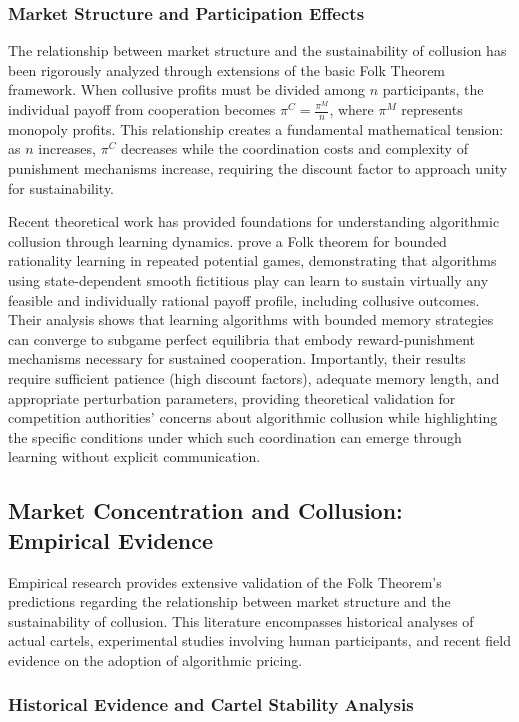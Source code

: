 \subsubsection*{Market Structure and Participation Effects}

The relationship between market structure and the sustainability of collusion has been rigorously analyzed through extensions of the basic Folk Theorem framework. When collusive profits must be divided among $n$ participants, the individual payoff from cooperation becomes $\pi^C = \frac{\pi^M}{n}$, where $\pi^M$ represents monopoly profits. This relationship creates a fundamental mathematical tension: as $n$ increases, $\pi^C$ decreases while the coordination costs and complexity of punishment mechanisms increase, requiring the discount factor to approach unity for sustainability.

Recent theoretical work has provided foundations for understanding algorithmic collusion through learning dynamics. \textcite{cartea_algorithmic_2022} prove a Folk theorem for bounded rationality learning in repeated potential games, demonstrating that algorithms using state-dependent smooth fictitious play can learn to sustain virtually any feasible and individually rational payoff profile, including collusive outcomes. Their analysis shows that learning algorithms with bounded memory strategies can converge to subgame perfect equilibria that embody reward-punishment mechanisms necessary for sustained cooperation. Importantly, their results require sufficient patience (high discount factors), adequate memory length, and appropriate perturbation parameters, providing theoretical validation for competition authorities' concerns about algorithmic collusion while highlighting the specific conditions under which such coordination can emerge through learning without explicit communication.

\subsection{Market Concentration and Collusion: Empirical Evidence}

Empirical research provides extensive validation of the Folk Theorem's predictions regarding the relationship between market structure and the sustainability of collusion. This literature encompasses historical analyses of actual cartels, experimental studies involving human participants, and recent field evidence on the adoption of algorithmic pricing.

\subsubsection*{Historical Evidence and Cartel Stability Analysis}

